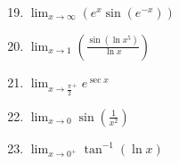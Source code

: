 \documentclass[12pt]{article}
\newif\ifans
\begin{document}
\begin{enumerate}
\setcounter{enumi}{18}

\item $\displaystyle \lim_{x\rightarrow \infty}{\left(e^x \sin {(e^{-x})}\right)}$\\

\ifans{\fbox{1}} \fi

\item $\displaystyle \lim_{x\rightarrow 1}{\left(\frac{\sin{(\ln x^5)}}{\ln x}\right)}$ 

\ifans{\fbox{5}} \fi

\item $\displaystyle \lim_{x \rightarrow \frac{\pi}{2}^+}{e^{\sec{x}}}$

\ifans{\fbox{0}} \fi

\item $\displaystyle \lim_{x \rightarrow 0}{\sin{\left(\frac{1}{x^2}\right)}}$

\ifans{\fbox{DNE}} \fi

\item $\displaystyle \lim_{x \rightarrow 0^+}{\tan^{-1}{(\ln{x})}}$

\ifans{\fbox{$\displaystyle -\frac{\pi}{2}$}} \fi

\end{enumerate}

\end{document}
